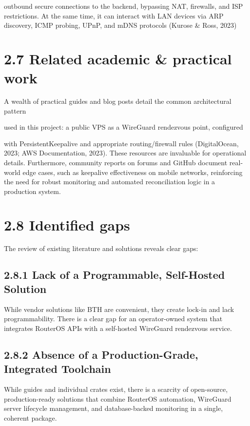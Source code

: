 \documentclass[12pt,a4paper,oneside]{report}
\begin{document}
outbound secure connections to the backend, bypassing NAT, firewalls, and ISP restrictions. At the same time, it can interact with LAN devices via ARP discovery, ICMP probing, UPnP, and mDNS protocols (Kurose \& Ross, 2023)


\section{2.7 Related academic \& practical work}

A wealth of practical guides and blog posts detail the common architectural pattern


used in this project: a public VPS as a WireGuard rendezvous point, configured


with PersistentKeepalive and appropriate routing/firewall rules (DigitalOcean, 2023; AWS Documentation, 2023). These resources are invaluable for operational details. Furthermore, community reports on forums and GitHub document real-world edge cases, such as keepalive effectiveness on mobile networks, reinforcing the need for robust monitoring and automated reconciliation logic in a production system.


\section{2.8 Identified gaps}

The review of existing literature and solutions reveals clear gaps:


\subsection{2.8.1 Lack of a Programmable, Self-Hosted Solution}

While vendor solutions like BTH are convenient, they create lock-in and lack programmability. There is a clear gap for an operator-owned system that integrates RouterOS APIs with a self-hosted WireGuard rendezvous service.


\subsection{2.8.2 Absence of a Production-Grade, Integrated Toolchain}

While guides and individual crates exist, there is a scarcity of open-source, production-ready solutions that combine RouterOS automation, WireGuard server lifecycle management, and database-backed monitoring in a single, coherent package.
\end{document}

